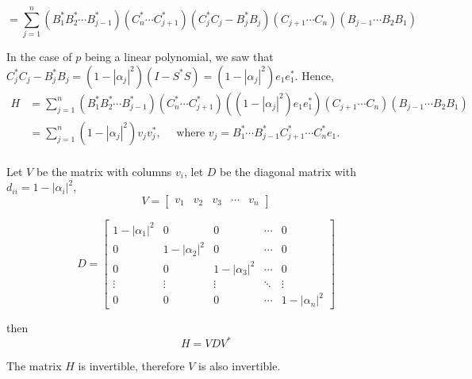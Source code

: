 \documentclass[twofold]{article}
\newcommand*\adj[1]{#1^*}
\newcommand*\abs[1]{\left \vert #1 \right\vert}
\theoremstyle{plain}
\theoremstyle{definition}
\theoremstyle{remark}
\begin{document}
\[= \sum_{j = 1} ^n (\adj{B_1} \adj{B_2} \cdots \adj{B_{j-1}})(\adj{C_{n}} \cdots \adj{C_{j+1}}) (\adj{C_j} C_j - \adj{B_j} B_j) (C_{j+1} \cdots C_n) (B_{j-1} \cdots B_2 B_1) \]


In the case of \(p\) being a linear polynomial, we saw that \(\adj{C_j} C_j - \adj{B_j} B_j  = (1 - \abs{\alpha_j}^2) (I - \adj{S} S)  = (1 - \abs{\alpha_j}^2) e_1 \adj{e_1}\). Hence, 
\begin{equation*}\begin{split}
H & = \sum_{j = 1} ^n (\adj{B_1} \adj{B_2} \cdots \adj{B_{j-1}})(\adj{C_{n}} \cdots \adj{C_{j+1}}) ((1-\abs{\alpha_j}^2) e_1 \adj{e_1}) (C_{j+1} \cdots C_n) (B_{j-1} \cdots B_2 B_1) \\
& =  \sum_{j=1} ^n (1-\abs{\alpha_j}^2) v_j \adj{v_j}, \quad \text{ where } v_j = \adj{B_1} \cdots \adj{B_{j-1}} \adj{C_{j+1}} \cdots \adj{C_n} e_1.\\
\end{split} \end{equation*}

Let \(V\) be the matrix with columns \(v_i\), let \(D\) be the diagonal matrix with \(d_{ii} = 1 - \abs{\alpha_i}^2\), 
\[V = \begin{bmatrix} v_1 & v_2 & v_3 & \cdots & v_n \end{bmatrix} \]

\[D = \begin{bmatrix} 1 - \abs{\alpha_1}^2 & 0 & 0 & \cdots & 0 \\
0 & 1 - \abs{\alpha_2}^2 & 0 & \cdots & 0 \\
0 & 0 & 1- \abs{\alpha_3}^2 & \cdots & 0 \\
\vdots & \vdots & \vdots & \ddots& \vdots \\
0 & 0 & 0 & \cdots & 1 - \abs{\alpha_n}^2 \end{bmatrix}\]

then 
\[H = V D \adj{V}\]

The matrix \(H\) is invertible, therefore \(V\) is also invertible. 
\end{document}
